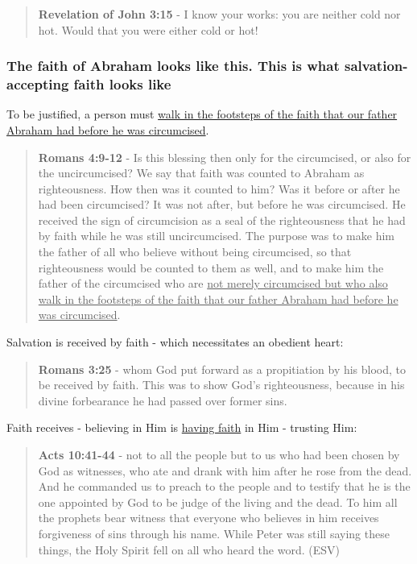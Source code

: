 \documentclass[11pt]{article}
\begin{document}
\begin{quote}
\textbf{Revelation of John 3:15} - I know your works: you are neither cold nor hot. Would that you were either cold or hot!
\end{quote}

\subsubsection{The faith of Abraham looks like this. This is what salvation-accepting faith looks like}
\label{sec:org3f3dad9}
To be justified, a person must \uline{walk in the footsteps of the faith that our father Abraham had before he was circumcised}.

\begin{quote}
\textbf{Romans 4:9-12} - Is this blessing then only for the circumcised, or also for the uncircumcised? We say that faith was counted to Abraham as righteousness. How then was it counted to him? Was it before or after he had been circumcised? It was not after, but before he was circumcised. He received the sign of circumcision as a seal of the righteousness that he had by faith while he was still uncircumcised. The purpose was to make him the father of all who believe without being circumcised, so that righteousness would be counted to them as well, and to make him the father of the circumcised who are \uline{not merely circumcised but who also walk in the footsteps of the faith that our father Abraham had before he was circumcised}.
\end{quote}

Salvation is received by faith - which necessitates an obedient heart:

\begin{quote}
\textbf{Romans 3:25} - whom God put forward as a propitiation by his blood, to be received by faith. This was to show God's righteousness, because in his divine forbearance he had passed over former sins.
\end{quote}

Faith receives - believing in Him is \uline{having faith} in Him - trusting Him:

\begin{quote}
\textbf{Acts 10:41-44} - not to all the people but to us who had been chosen by God as witnesses, who ate and drank with him after he rose from the dead. And he commanded us to preach to the people and to testify that he is the one appointed by God to be judge of the living and the dead. To him all the prophets bear witness that everyone who believes in him receives forgiveness of sins through his name. While Peter was still saying these things, the Holy Spirit fell on all who heard the word. (ESV)
\end{quote}
\end{document}
